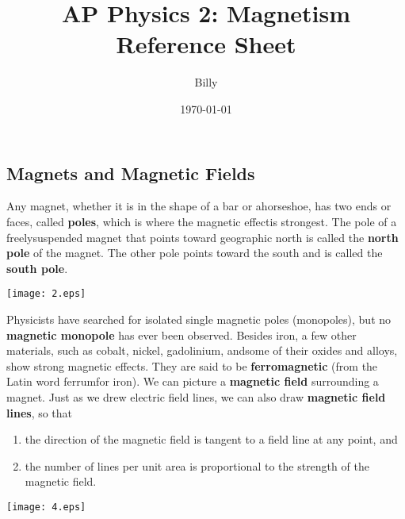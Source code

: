 \documentclass{elegantpaper}
\title{\large{\textbf{AP Physics 2: Magnetism Reference Sheet}}}
\author{\normalsize{Billy}}
\date{\small\today}
\begin{document}
\begin{multicols}{3}
  \setlength{\premulticols}{1pt}
  \setlength{\postmulticols}{1pt}
  \setlength{\multicolsep}{1pt}
  \setlength{\columnsep}{2pt}
  \maketitle
  \section{Magnets and Magnetic Fields}
Any magnet, whether it is in the shape of a bar or ahorseshoe, has two ends or faces, called \textbf{poles}, which is where the magnetic effectis strongest. The pole of a freelysuspended magnet that points toward geographic north is called the \textbf{north pole} of the magnet. The other pole points toward the south and is called the \textbf{south pole}.
\begin{minipage}{\linewidth}
  \vspace{0.5cm}
  \setlength{\abovecaptionskip}{0.2cm}
  \setlength{\belowcaptionskip}{0.3cm}
  \centering
  \texttt{[image: 2.eps]}
  \label{fig:20-2}
\end{minipage}
Physicists have searched for isolated single magnetic poles (monopoles), but no \textbf{magnetic monopole} has ever been observed. Besides iron, a few other materials, such as cobalt, nickel, gadolinium, andsome of their oxides and alloys, show strong magnetic effects. They are said to be \textbf{ferromagnetic} (from the Latin word ferrumfor iron). We can picture a \textbf{magnetic field} surrounding a magnet. Just as we drew electric field lines, we can also draw \textbf{magnetic field lines}, so that
\begin{enumerate}
  \item the direction of the magnetic field is tangent to a field line at any point, and 
  \item the number of lines per unit area is proportional to the strength of the magnetic field.
\end{enumerate}
\begin{minipage}{\linewidth}
  \vspace{0.5cm}
  \setlength{\abovecaptionskip}{0.2cm}
  \setlength{\belowcaptionskip}{0.3cm}
  \centering
  \texttt{[image: 4.eps]}
  \label{fig:20-4}
\end{minipage}


\end{multicols}
\end{document}
